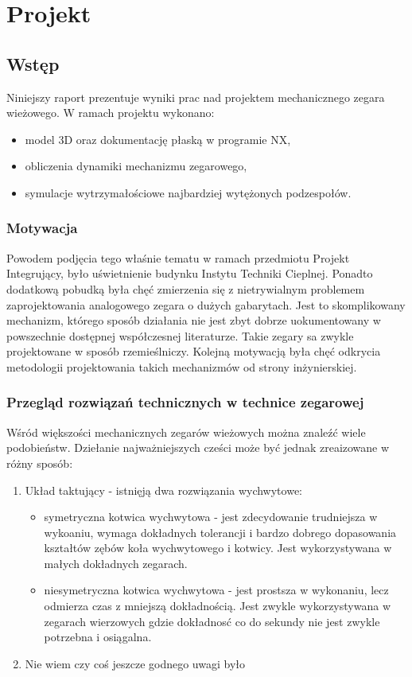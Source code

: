 \chapter{Projekt}
    \section{Wstęp}
    Niniejszy raport prezentuje wyniki prac nad projektem mechanicznego zegara wieżowego.
    W ramach projektu wykonano:
   \begin{itemize}
   	\item model 3D oraz dokumentację płaską w programie NX,
   	\item obliczenia dynamiki mechanizmu zegarowego,
   	\item symulacje wytrzymałościowe najbardziej wytężonych podzespołów.
   \end{itemize}
	
	
        \subsection{Motywacja}
        Powodem podjęcia tego właśnie tematu w ramach przedmiotu Projekt Integrujący, było uświetnienie budynku Instytu Techniki Cieplnej.
        Ponadto dodatkową pobudką była chęć zmierzenia się z nietrywialnym problemem zaprojektowania analogowego zegara o dużych gabarytach.
        Jest to skomplikowany mechanizm, którego sposób działania nie jest zbyt dobrze uokumentowany w powszechnie dostępnej współczesnej literaturze. Takie zegary sa zwykle projektowane w sposób rzemieślniczy. Kolejną motywacją była chęć odkrycia metodologii projektowania takich mechanizmów od strony inżynierskiej.
        \subsection{Przegląd rozwiązań technicznych w technice zegarowej}
        Wśród większości mechanicznych zegarów wieżowych można znaleźć wiele podobieństw.
        Dziełanie najważniejszych cześci może być jednak zreaizowane w różny sposób:
        \begin{enumerate}
        	\item Układ taktujący - istnięją dwa rozwiązania wychwytowe:
        	\begin{itemize}
        		\item symetryczna kotwica wychwytowa - jest zdecydowanie trudniejsza w wykoaniu, wymaga dokładnych tolerancji i bardzo dobrego dopasowania kształtów zębów koła wychwytowego i kotwicy. Jest wykorzystywana w małych dokładnych zegarach.
        		\item niesymetryczna kotwica wychwytowa - jest prostsza w wykonaniu, lecz odmierza czas z mniejszą dokładnością. Jest zwykle wykorzystywana w zegarach wierzowych gdzie dokładnosć co do sekundy nie jest zwykle potrzebna i osiągalna.
        	\end{itemize}
        \item Nie wiem czy coś jeszcze godnego uwagi było
       	\end{enumerate}	

